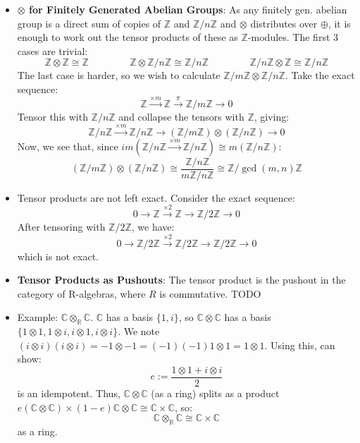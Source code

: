 \documentclass[11pt, oneside]{amsart}   	%
\theoremstyle{definition}
\begin{document}
\begin{itemize}
	\item \textbf{$\otimes$ for Finitely Generated Abelian Groups}: As any finitely gen. abelian group is a direct sum of copies of $\mathbb Z$ and 
	$\mathbb Z / n\mathbb Z$ and $\otimes$ distributes over $\oplus$, it is enough to work out the tensor products of these as $\mathbb Z$-modules. 
	The first 3 cases are trivial:
	$$
		\mathbb Z\otimes \mathbb Z\cong \mathbb Z \;\;\;\;\;\;\;\;\;\;\;\;\;\;\; \mathbb Z\otimes \mathbb Z / n\mathbb Z\cong \mathbb Z / n \mathbb Z \;\;\;\;\;
		\;\;\;\;\;\;\;\;\;\; \mathbb Z / n\mathbb Z\otimes\mathbb Z\cong\mathbb Z / n \mathbb Z
	$$
	The last case is harder, so we wish to calculate $\mathbb Z / m\mathbb Z\otimes \mathbb Z / n\mathbb Z$. Take the exact sequence:
	$$
		\mathbb Z\xrightarrow{\times m}\mathbb Z\xrightarrow{\pi} \mathbb Z / m\mathbb Z\rightarrow 0
	$$
	Tensor this with $\mathbb Z / n\mathbb Z$ and collapse the tensors with $\mathbb Z$, giving:
	$$
		\mathbb Z / n\mathbb Z\xrightarrow{\times m}\mathbb Z/n\mathbb Z\rightarrow (\mathbb Z / m\mathbb Z)\otimes (\mathbb Z / n\mathbb Z)
		\rightarrow 0
	$$
	Now, we see that, since $im(\mathbb Z / n\mathbb Z\xrightarrow{\times m}\mathbb Z/n\mathbb Z) \cong m(\mathbb Z / n\mathbb Z)$:
	$$
		(\mathbb Z / m\mathbb Z)\otimes (\mathbb Z / n\mathbb Z)\cong \frac{\mathbb Z / n\mathbb Z}{m\mathbb Z / n\mathbb Z}\cong \mathbb Z / 
		\gcd(m, n)\mathbb Z
	$$
	
	\item Tensor products are not left exact. Consider the exact sequence:
	$$
		0\rightarrow \mathbb Z \xrightarrow{\times 2}\mathbb Z\rightarrow \mathbb Z / 2\mathbb Z\rightarrow 0
	$$
	After tensoring with $\mathbb Z / 2\mathbb Z$, we have:
	$$
		0\rightarrow\mathbb Z / 2\mathbb Z\xrightarrow{\times 2}\mathbb Z / 2\mathbb Z\rightarrow \mathbb Z / 2\mathbb Z\rightarrow 0
	$$
	which is not exact.
	
	\item \textbf{Tensor Products as Pushouts}: The tensor product is the pushout in the category of R-algebras, where $R$ is commutative. TODO
	
	\item Example: $\mathbb C \otimes_{\mathbb R}\mathbb C$. $\mathbb C$ has a basis $\{1, i\}$, so $\mathbb C\otimes \mathbb C$ has a basis 
	 $\{1\otimes 1, 1\otimes i, i\otimes 1, i\otimes i\}$. We note $(i\otimes i)(i\otimes i) = -1\otimes -1 = (-1)(-1)1\otimes 1 = 1\otimes 1$. Using this, can 
	 show:
	 $$
	 	e := \frac{1\otimes 1 + i\otimes i}{2}
	 $$
	 is an idempotent. Thus, $\mathbb C\otimes \mathbb C$ (as a ring) splits as a product $e(\mathbb C\otimes\mathbb C)\times (1 - e)\mathbb C\otimes 
	 \mathbb C\cong \mathbb C\times \mathbb C$, so:
	 $$
	 	\mathbb C\otimes_{\mathbb R}\mathbb C\cong \mathbb C\times\mathbb C
	 $$
	 as a ring.
	 

\end{itemize}
\end{document}
